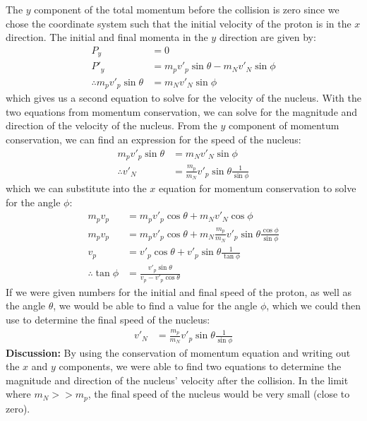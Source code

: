 \begin{example}
The $y$ component of the total momentum before the collision is zero since we chose the coordinate system such that the initial velocity of the proton is in the $x$ direction. The initial and final momenta in the $y$ direction are given by:
\begin{align*}
P_y &= 0\\
P'_y &= m_p v'_p\sin\theta - m_N v'_N\sin\phi\\
\therefore m_p v'_p\sin\theta &= m_N v'_N\sin\phi
\end{align*}
which gives us a second equation to solve for the velocity of the nucleus. With the two equations from momentum conservation, we can solve for the magnitude and direction of the velocity of the nucleus. From the $y$ component of momentum conservation, we can find an expression for the speed of the nucleus:
\begin{align*}
m_p v'_p\sin\theta &= m_N v'_N\sin\phi\\
\therefore v'_N &= \frac{m_p}{m_N}v'_p\sin\theta \frac{1}{\sin\phi}
\end{align*}
which we can substitute into the $x$ equation for momentum conservation to solve for the angle $\phi$:
\begin{align*}
m_p v_p &= m_p v'_p\cos\theta + m_N v'_N\cos\phi\\
m_p v_p &= m_p v'_p\cos\theta + m_N\frac{m_p}{m_N}v'_p\sin\theta \frac{\cos\phi}{\sin\phi} \\
v_p &= v'_p\cos\theta + v'_p\sin\theta \frac{1}{\tan\phi}\\
\therefore \tan\phi &=  \frac{v'_p\sin\theta}{v_p-v'_p\cos\theta}
\end{align*}
If we were given numbers for the initial and final speed of the proton, as well as the angle $\theta$, we would be able to find a value for the angle $\phi$, which we could then use to determine the final speed of the nucleus:
\begin{align*}
 v'_N &= \frac{m_p}{m_N}v'_p\sin\theta \frac{1}{\sin\phi}
\end{align*}
\textbf{Discussion:} By using the conservation of momentum equation and writing out the $x$ and $y$ components, we were able to find two equations to determine the magnitude and direction of the nucleus' velocity after the collision. In the limit where $m_N >> m_p$, the final speed of the nucleus would be very small (close to zero). 
\end{example}

